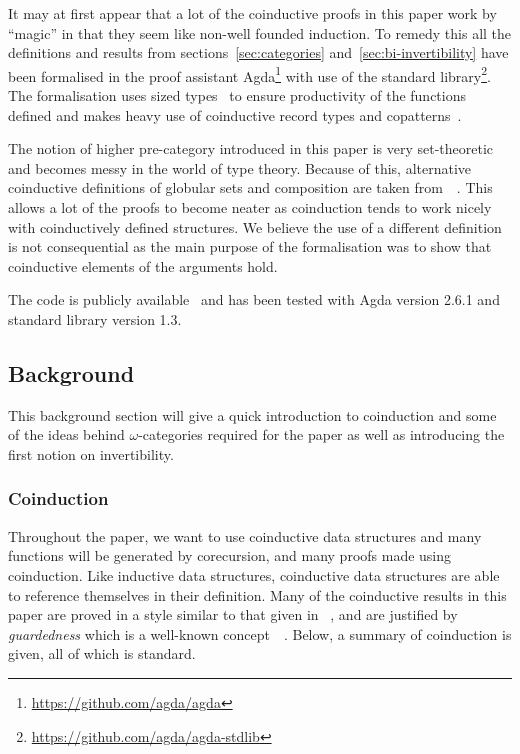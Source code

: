 \documentclass{article}
\begin{document}
It may at first appear that a lot of the coinductive proofs in this
paper work by ``magic'' in that they seem like non-well founded
induction. To remedy this all the definitions and results from
sections~\ref{sec:categories} and~\ref{sec:bi-invertibility} have
been formalised in the proof assistant
Agda\footnote{\url{https://github.com/agda/agda}} with use of the
standard library\footnote{\url{https://github.com/agda/agda-stdlib}}.
The formalisation uses sized types~\cite{Abel_2010} to ensure
productivity of the functions defined and makes heavy use of
coinductive record types and
copatterns~\cite{10.1145/2480359.2429075}.

The notion of higher pre-category introduced in this paper is very
set-theoretic and becomes messy in the world of type theory. Because
of this, alternative coinductive definitions of globular sets and
composition are taken
from~~\cite{hirschowitz_et_al:LIPIcs:2015:5166}.
This allows a lot of the proofs to become neater as coinduction tends
to work nicely with coinductively defined structures. We believe the
use of a different definition is not consequential as the main purpose
of the formalisation was to show that coinductive elements of the
arguments hold.

The code is publicly available~\cite{rice_agda} and has been tested
with Agda version 2.6.1 and standard library version
1.3.

\subsection{Background}\label{sec:background}

This background section will give a quick introduction to coinduction and some of the ideas behind \(\omega\)-categories required for the paper as well as introducing the first notion on invertibility.

\subsubsection{Coinduction}\label{sec:coinduction}

Throughout the paper, we want to use coinductive data structures and
many functions will be generated by corecursion, and many proofs made
using coinduction. Like inductive data structures, coinductive data
structures are able to reference themselves in their definition. Many
of the coinductive results in this paper are proved in a style similar
to that given in ~\cite{kozen_silva_2017},
and are justified by \emph{guardedness} which is a well-known
concept~\cite{10.1007/3-540-58085-9_72}~\cite{gimenez1995codifying}.
Below, a summary of coinduction is given, all of which is standard.
\end{document}
